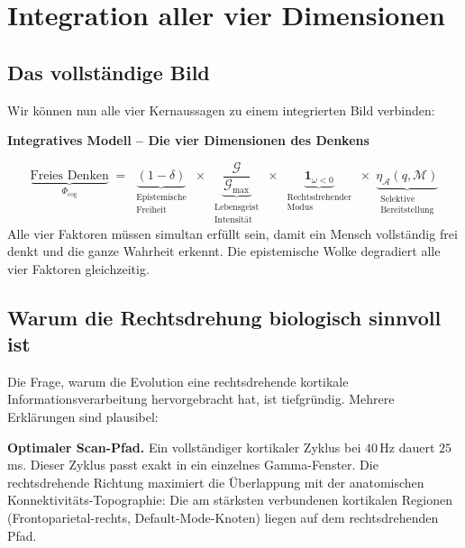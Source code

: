 ﻿\documentclass[12pt,a4paper]{report}
\theoremstyle{plain}
\theoremstyle{definition}
\theoremstyle{remark}
\begin{document}
	\chapter{Integration aller vier Dimensionen}
	
	\section{Das vollständige Bild}
	
	Wir können nun alle vier Kernaussagen zu einem integrierten Bild verbinden:
	
	
	\noindent\textbf{Integratives Modell -- Die vier Dimensionen des Denkens}

		\[
		\underbrace{\text{Freies Denken}}_{\Phi_{\mathrm{cog}}}
		\;=\;
		\underbrace{(1-\delta)}_{\substack{\text{Epistemische}\\\text{Freiheit}}}
		\;\times\;
		\underbrace{\frac{\mathcal{G}}{\mathcal{G}_{\max}}}_{\substack{\text{Lebensgeist}\\\text{Intensität}}}
		\;\times\;
		\underbrace{\mathbf{1}_{\omega<0}}_{\substack{\text{Rechtsdrehender}\\\text{Modus}}}
		\;\times\;
		\underbrace{\eta_{\mathcal{A}}(q,\mathcal{M})}_{\substack{\text{Selektive}\\\text{Bereitstellung}}}
		\]
		Alle vier Faktoren müssen simultan erfüllt sein, damit ein Mensch
		vollständig frei denkt und die ganze Wahrheit erkennt.
		Die epistemische Wolke degradiert alle vier Faktoren gleichzeitig.

	
	\section{Warum die Rechtsdrehung biologisch sinnvoll ist}
	
	Die Frage, warum die Evolution eine rechtsdrehende kortikale
	Informationsverarbeitung hervorgebracht hat, ist tiefgründig.
	Mehrere Erklärungen sind plausibel:
	
	\textbf{Optimaler Scan-Pfad.}
	Ein vollständiger kortikaler Zyklus bei $40$\,Hz dauert $25$\,ms.
	Dieser Zyklus passt exakt in ein einzelnes Gamma-Fenster.
	Die rechtsdrehende Richtung maximiert die Überlappung mit der anatomischen
	Konnektivitäts-Topographie: Die am stärksten verbundenen kortikalen
	Regionen (Frontoparietal-rechts, Default-Mode-Knoten) liegen
	auf dem rechtsdrehenden Pfad.
	
\end{document}
